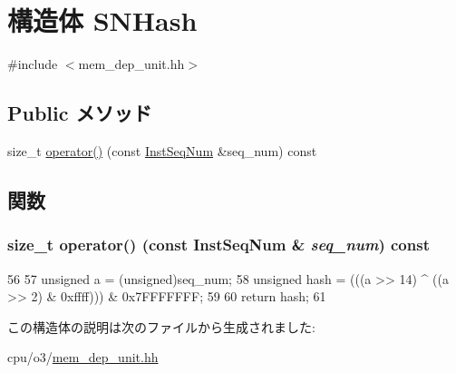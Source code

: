 \hypertarget{structSNHash}{
\section{構造体 SNHash}
\label{structSNHash}
}


{\ttfamily \#include $<$mem\_\-dep\_\-unit.hh$>$}\subsection*{Public メソッド}
\begin{DoxyCompactItemize}
\item 
size\_\-t \hyperlink{structSNHash_a75f8fc845b3130c527cc477708efe117}{operator()} (const \hyperlink{inst__seq_8hh_a258d93d98edaedee089435c19ea2ea2e}{InstSeqNum} \&seq\_\-num) const 
\end{DoxyCompactItemize}


\subsection{関数}
\hypertarget{structSNHash_a75f8fc845b3130c527cc477708efe117}{
\subsubsection[{operator()}]{\setlength{\rightskip}{0pt plus 5cm}size\_\-t operator() (const {\bf InstSeqNum} \& {\em seq\_\-num}) const}}
\label{structSNHash_a75f8fc845b3130c527cc477708efe117}



\begin{DoxyCode}
56                                                         {
57         unsigned a = (unsigned)seq_num;
58         unsigned hash = (((a >> 14) ^ ((a >> 2) & 0xffff))) & 0x7FFFFFFF;
59 
60         return hash;
61     }
\end{DoxyCode}


この構造体の説明は次のファイルから生成されました:\begin{DoxyCompactItemize}
\item 
cpu/o3/\hyperlink{o3_2mem__dep__unit_8hh}{mem\_\-dep\_\-unit.hh}\end{DoxyCompactItemize}

